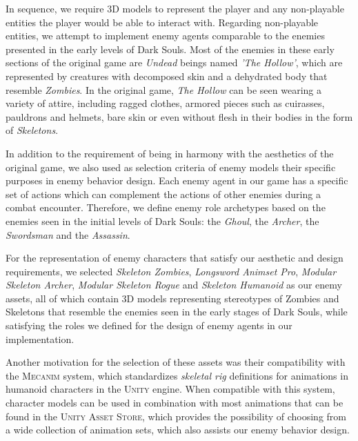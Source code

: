 


In sequence, we require 3D models to represent the player and any non-playable entities the player would be able to interact with. Regarding non-playable entities, we attempt to implement enemy agents comparable to the enemies presented in the early levels of Dark Souls. Most of the enemies in these early sections of the original game are \emph{Undead} beings named \emph{'The Hollow'}, which are represented by creatures with decomposed skin and a dehydrated body that resemble \emph{Zombies}. In the original game, \emph{The Hollow} can be seen wearing a variety of attire, including ragged clothes, armored pieces such as cuirasses, pauldrons and helmets, bare skin or even without flesh in their bodies in the form of \emph{Skeletons}.

In addition to the requirement of being in harmony with the aesthetics of the original game, we also used as selection criteria of enemy models their specific purposes in enemy behavior design. Each enemy agent in our game has a specific set of actions which can complement the actions of other enemies during a combat encounter. Therefore, we define enemy role archetypes based on the enemies seen in the initial levels of Dark Souls: the \emph{Ghoul}, the \emph{Archer}, the \emph{Swordsman} and the \emph{Assassin}.

For the representation of enemy characters that satisfy our aesthetic and design requirements, we selected \emph{Skeleton Zombies}, \emph{Longsword Animset Pro}, \emph{Modular Skeleton Archer}, \emph{Modular Skeleton Rogue} and \emph{Skeleton Humanoid} as our enemy assets, all of which contain 3D models representing stereotypes of Zombies and Skeletons that resemble the enemies seen in the early stages of Dark Souls, while satisfying the roles we defined for the design of enemy agents in our implementation.

Another motivation for the selection of these assets was their compatibility with the \textsc{Mecanim} system, which standardizes \emph{skeletal rig} definitions for animations in humanoid characters in the \textsc{Unity} engine. When compatible with this system, character models can be used in combination with most animations that can be found in the \textsc{Unity Asset Store}, which provides the possibility of choosing from a wide collection of animation sets, which also assists our enemy behavior design.

